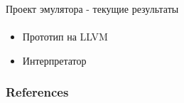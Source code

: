 \documentclass{beamer}              %
\begin{document}
\begin{frame}{Проект эмулятора - текущие результаты}
  \framesubtitle{}
  
  \begin{itemize}
      \item Прототип на LLVM
      \item Интерпретатор
  \end{itemize}
  
\end{frame}

\begin{frame}[allowframebreaks]
        \frametitle{References}
        
        
\end{frame}
\end{document}
